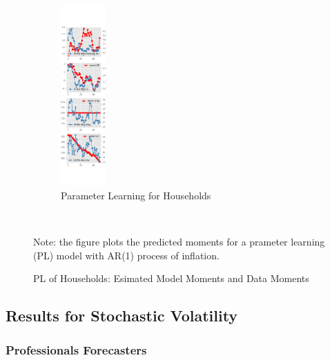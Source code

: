 \documentclass[]{article}
\begin{document}
\begin{figure}[ht]
	\centering
	\begin{subfigure}[b]{\textwidth}
		\centering
		\caption{Parameter Learning for Households}
		\label{PL_diag_SCE}
		\includegraphics[width=0.19\textwidth]{figures/sce_pl_est_diag.png}
	\end{subfigure} \\
	\begin{flushleft}
		{\footnotesize Note: the figure plots the predicted moments for a prameter learning (PL) model with AR(1) process of inflation.}
	\end{flushleft}
	\caption{PL of Households: Esimated Model Moments and Data Moments}
\end{figure}


\subsection{Results for Stochastic Volatility}

\subsubsection{Professionals Forecasters}
\end{document}
